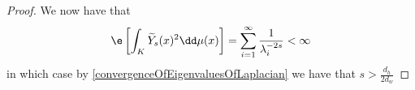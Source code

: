 \begin{proof}
	We now have that
	\begin{equation}
		\e \left[\int_{K} \widetilde{Y}_{s}(x)^2 \dd \mu (x)\right] = \sum_{i = 1}^{\infty} \frac{1}{\lambda_i^{-2s}} < \infty
	\end{equation}
in which case by \cref{convergenceOfEigenvaluesOfLaplacian} we have that $s > \frac{d_h}{2d_w}$
\end{proof}